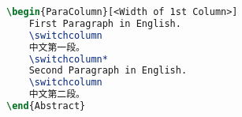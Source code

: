 \begin{lstlisting}[language=LaTeX, label=listing:paracolumn]
\begin{ParaColumn}[<Width of 1st Column>]
    First Paragraph in English.
    \switchcolumn
    中文第一段。
    \switchcolumn*
    Second Paragraph in English.
    \switchcolumn
    中文第二段。
\end{Abstract}
\end{lstlisting}